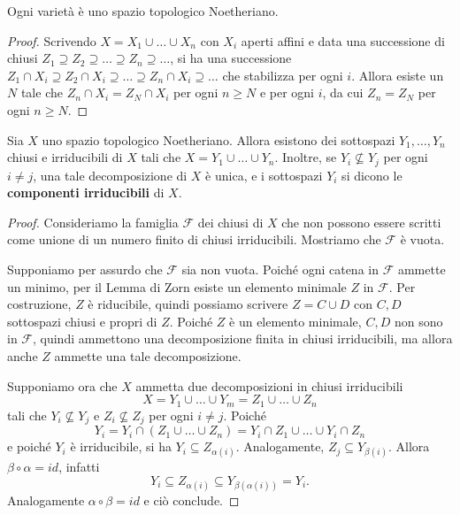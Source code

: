 \begin{remark}
    Ogni varietà è uno spazio topologico Noetheriano.
\end{remark}
\begin{proof}
Scrivendo $X=X_1\cup\ldots\cup X_n$ con $X_i$ aperti affini e data una successione di chiusi $Z_1\supseteq Z_2 \supseteq \ldots \supseteq Z_n \supseteq\ldots$, si ha una successione $Z_1\cap X_i\supseteq Z_2 \cap X_i\supseteq \ldots \supseteq Z_n  \cap X_i\supseteq\ldots$  che stabilizza per ogni $i$. Allora esiste un $N$ tale che $Z_n\cap X_i= Z_N \cap X_i$ per ogni $n\ge N$ e per ogni $i$, da cui $Z_n=Z_N$ per ogni $n\ge N$.
\end{proof}

\begin{proposition}
    Sia $X$ uno spazio topologico Noetheriano. Allora esistono dei sottospazi $Y_1,\ldots,Y_n$ chiusi e irriducibili di $X$ tali che $X=Y_1\cup\ldots\cup Y_n$. Inoltre, se $Y_i\not\subseteq Y_j$ per ogni $i\ne j$, una tale decomposizione di $X$ è unica, e i sottospazi $Y_i$ si dicono le \textbf{componenti irriducibili} di $X$.
\end{proposition}

\begin{proof}
    Consideriamo la famiglia $\mathcal{F}$ dei chiusi di $X$ che non possono essere scritti come unione di un numero finito di chiusi irriducibili. Mostriamo che $\mathcal{F}$ è vuota.

    Supponiamo per assurdo che $\mathcal{F}$ sia non vuota. Poiché ogni catena in $\mathcal{F}$ ammette un minimo, per il Lemma di Zorn esiste un elemento minimale $Z$ in $\mathcal{F}$. Per costruzione, $Z$ è riducibile, quindi possiamo scrivere $Z=C\cup D$ con $C,D$ sottospazi chiusi e propri di $Z$. Poiché $Z$ è un elemento minimale, $C,D$ non sono in $\mathcal{F}$, quindi ammettono una decomposizione finita in chiusi irriducibili, ma allora anche $Z$ ammette una tale decomposizione. 

    Supponiamo ora che $X$ ammetta due decomposizioni in chiusi irriducibili \[X=Y_1\cup\ldots\cup Y_m=Z_1\cup\ldots\cup Z_n\] tali che $Y_i\not\subseteq Y_j$ e $Z_i\not\subseteq Z_j$ per ogni $i\ne j$. Poiché \[Y_i=Y_i\cap (Z_1\cup\ldots\cup Z_n)=Y_i\cap Z_1\cup\ldots\cup Y_i\cap Z_n\] e poiché $Y_i$ è irriducibile, si ha $Y_i\subseteq Z_{\alpha(i)}$. Analogamente, $Z_j\subseteq Y_{\beta(i)}$. Allora $\beta\circ\alpha=id$, infatti \[Y_i\subseteq Z_{\alpha(i)}\subseteq Y_{\beta(\alpha(i))}=Y_i.\]
    Analogamente $\alpha\circ\beta=id$ e ciò conclude.
\end{proof}


